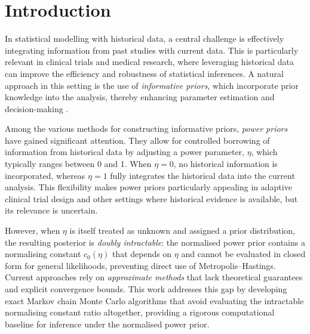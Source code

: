 \chapter{Introduction}

\label{sec:intro}


In statistical modelling with historical data, a central challenge is effectively integrating information from past studies with current data.
This is particularly relevant in clinical trials and medical research, where leveraging historical data can improve the efficiency and robustness of statistical inferences.
A natural approach in this setting is the use of \textit{informative priors}, which incorporate prior knowledge into the analysis, thereby enhancing parameter estimation and decision-making \cite{spiegelhalter2004, gelman2013, ibrahim2015}.

Among the various methods for constructing informative priors, \textit{power priors} \cite{ibrahim2000, ibrahim2015} have gained significant attention.
They allow for controlled borrowing of information from historical data by adjusting a power parameter, $\eta$, which typically ranges between 0 and 1.
When $\eta = 0$, no historical information is incorporated, whereas $\eta = 1$ fully integrates the historical data into the current analysis.
This flexibility makes power priors particularly appealing in adaptive clinical trial design and other settings where historical evidence is available, but its relevance is uncertain.

However, when $\eta$ is itself treated as unknown and assigned a prior distribution, the resulting posterior is \textit{doubly intractable}: the normalised power prior contains a normalising constant $c_0(\eta)$ that depends on $\eta$ and cannot be evaluated in closed form for general likelihoods, preventing direct use of Metropolis--Hastings.
Current approaches rely on \textit{approximate methods} \cite{carvalho2021} that lack theoretical guarantees and explicit convergence bounds.
This work addresses this gap by developing exact Markov chain Monte Carlo algorithms \cite{murray2012, goncalves2017, vats2021} that avoid evaluating the intractable normalising constant ratio altogether, providing a rigorous computational baseline for inference under the normalised power prior.

